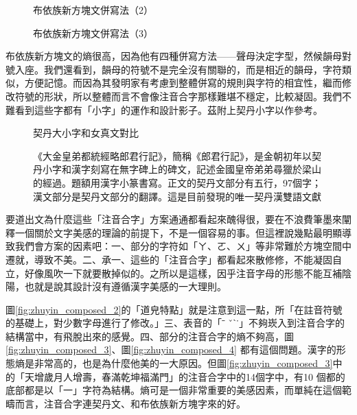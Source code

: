 \documentclass[a5paper, 12pt, openany]{book} %
\begin{document}
\begin{figure}[H]
\centering
\caption{布依族新方塊文併寫法（2）}
\end{figure}


\begin{figure}[H]
\centering
\caption{布依族新方塊文併寫法（3）}
\end{figure}


布依族新方塊文的熵很高，因為他有四種併寫方法——聲母決定字型，然候韻母對號入座。我們還看到，韻母的符號不是完全沒有關聯的，而是相近的韻母，字符類似，方便記憶。而因為其發明家有考慮到整體併寫的規則與字符的相宜性，繼而修改符號的形狀，所以整體而言不會像注音合字那樣難堪不穩定，比較凝固。我們不難看到這些字都有「小字」的運作和設計影子。茲附上契丹小字以作參考。

  \begin{figure}[H]
\centering
\caption{契丹大小字和女真文對比}
\label{fig:gujinwenzijicheng}
\end{figure}


\begin{figure}[H]
\centering
\caption{《大金皇弟都統經略郎君行記》，簡稱《郎君行記》，是金朝初年以契丹小字和漢字刻寫在無字碑上的碑文，記述金國皇帝弟弟尋獵於梁山的經過。題額用漢字小篆書寫。正文的契丹文部分有五行，97個字；漢文部分是契丹文部分的翻譯。這是目前發現的唯一契丹漢雙語文獻}
\label{fig:khitan_1}
\end{figure}


要道出文為什麼這些「注音合字」方案通通都看起來醜得很，要在不浪費筆墨來闡釋一個關於文字美感的理論的前提下，不是一個容易的事。但這裡說幾點最明顯導致我們會方案的因素吧：一、部分的字符如「ㄚ、ㄛ、ㄨ」等非常難於方塊空間中遷就，導致不美。二、承一、這些的「注音合字」都看起來散修修，不能凝固自立，好像風吹一下就要散掉似的。之所以是這樣，因乎注音字母的形態不能互補陰陽，也就是說其設計沒有遵循漢字美感的一大理則。

圖\ref{fig:zhuyin_composed_2}的「道皃特點」就是注意到這一點，所「在註音符號的基礎上，對少數字母進行了修改。」三、表音的「ˉ ˇˋ˙」不夠崁入到注音合字的結構當中，有飛脫出來的感覺。四、部分的注音合字的熵不夠高，圖 \ref{fig:zhuyin_composed_3}、圖\ref{fig:zhuyin_composed_4} 都有這個問題。漢字的形態熵是非常高的，也是為什麼他美的一大原因。但圖\ref{fig:zhuyin_composed_3}中的「天增歲月人增壽，春滿乾坤福滿門」的注音合字中的14個字中，有10 個都的底部都是以「一」字符為結構。熵可是一個非常重要的美感因素，而單純在這個範疇而言，注音合字連契丹文、和布依族新方塊字來的好。
\end{document}
